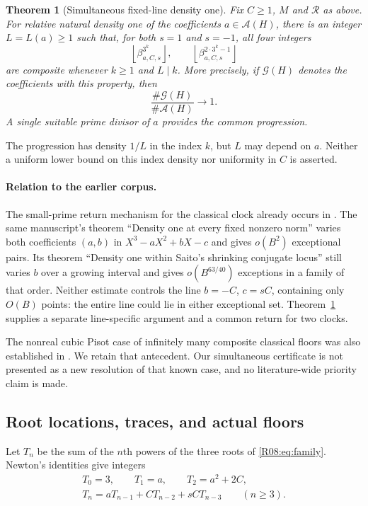 \documentclass[11pt,a4paper]{article}
\newtheorem{theorem}{Theorem}[section]
\theoremstyle{definition}\newtheorem{definition}[theorem]{Definition}
\theoremstyle{remark}\newtheorem{remark}[theorem]{Remark}
\newcommand{\floor}[1]{\left\lfloor#1\right\rfloor}
\begin{document}
\begin{theorem}[Simultaneous fixed-line density one]\label{R08:thm:main}
Fix $C\ge1$, $M$ and $\mathcal R$ as above. For relative natural density
one of the coefficients $a\in\mathcal A(H)$, there is an integer
$L=L(a)\ge1$ such that, for both $s=1$ and $s=-1$, all four integers
\[
 \floor{\beta_{a,C,s}^{3^k}},\qquad
 \floor{\beta_{a,C,s}^{2\cdot3^k-1}}
\]
are composite whenever $k\ge1$ and $L\mid k$.
More precisely, if $\mathcal G(H)$ denotes the coefficients with this
property, then
\[
                         \frac{\#\mathcal G(H)}{\#\mathcal A(H)}\longrightarrow1.
\]
A single suitable prime divisor of $a$ provides the common progression.
\end{theorem}

The progression has density $1/L$ in the index $k$, but $L$ may depend
on $a$. Neither a uniform lower bound on this index density nor uniformity
in $C$ is asserted.

\paragraph{Relation to the earlier corpus.}
The small-prime return mechanism for the classical clock already occurs
in \cite[lemma ``A uniform small-prime return condition'']{K031}.
The same manuscript's theorem ``Density one at every fixed nonzero norm''
varies both coefficients $(a,b)$ in $X^3-aX^2+bX-c$ and gives
$o(B^2)$ exceptional pairs. Its theorem ``Density one within Saito's
shrinking conjugate locus'' still varies $b$ over a growing interval
and gives $o(B^{63/40})$ exceptions in a family of that order.
Neither estimate controls the line $b=-C$, $c=sC$, containing only
$O(B)$ points: the entire line could lie in either exceptional set.
Theorem~\ref{R08:thm:main} supplies a separate line-specific argument and
a common return for two clocks.

The nonreal cubic Pisot case of infinitely many composite classical
floors was also established in \cite[theorem ``Nonreal cubic conjugates'']{K031}.
We retain that antecedent. Our simultaneous certificate is not presented
as a new resolution of that known case, and no literature-wide priority
claim is made.

\subsection{Root locations, traces, and actual floors}

Let $T_n$ be the sum of the $n$th powers of the three roots of
\eqref{R08:eq:family}. Newton's identities give integers
\begin{equation}\label{R08:eq:newton}
 \begin{gathered}
 T_0=3,\qquad T_1=a,\qquad T_2=a^2+2C,\\
 T_n=aT_{n-1}+CT_{n-2}+sCT_{n-3}\qquad(n\ge3).
 \end{gathered}
\end{equation}
\end{document}
